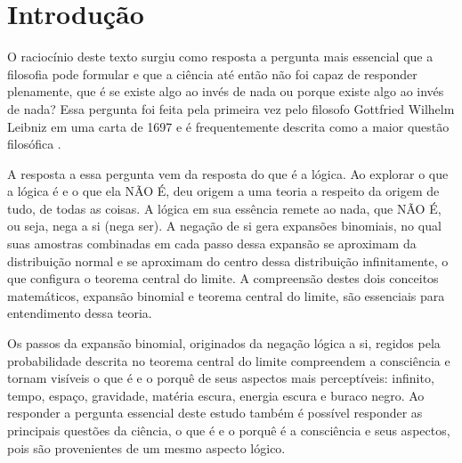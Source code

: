 \section*{Introdução}

O raciocínio deste texto surgiu como resposta a pergunta mais essencial que a filosofia pode formular e que a ciência até então não foi capaz de responder plenamente, que é se existe algo ao invés de nada ou porque existe algo ao invés de nada? 
Essa pergunta foi feita pela primeira vez pelo filosofo Gottfried Wilhelm Leibniz em uma carta de 1697 e é frequentemente descrita como a maior questão filosófica \cite{ leibnizbrasil_origem_das_coisas}.

A resposta a essa pergunta vem da resposta do que é a lógica. Ao explorar o que a lógica é e o que ela NÃO É, deu origem a uma teoria a respeito da origem de tudo, de todas as coisas. A lógica em sua essência remete ao nada, que NÃO É, ou seja, nega a si (nega ser). A negação de si gera expansões binomiais, no qual suas amostras combinadas em cada passo dessa expansão se aproximam da distribuição normal e se aproximam do centro dessa distribuição infinitamente, o que configura o teorema central do limite. A compreensão destes dois conceitos matemáticos, expansão binomial e teorema central do limite, são essenciais para entendimento dessa teoria.

Os passos da expansão binomial, originados da negação lógica a si, regidos pela probabilidade descrita no teorema central do limite compreendem a consciência e tornam visíveis o que é e o porquê de seus aspectos mais perceptíveis: infinito, tempo, espaço, gravidade, matéria escura, energia escura e buraco negro. Ao responder a pergunta essencial deste estudo também é possível responder as principais questões da ciência, o que é e o porquê é a consciência e seus aspectos, pois são provenientes de um mesmo aspecto lógico.

